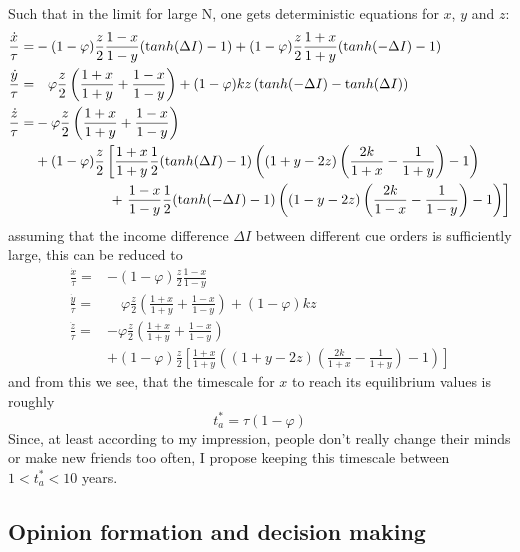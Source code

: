 Such that in the limit for large N, one gets deterministic equations for $x$, $y$ and $z$:
\begin{align}
	\frac{\dot{x}}{\tau} =& -(1-\varphi)\frac{z}{2}\frac{1-x}{1-y}({\mathrm tanh}(\Delta I)-1) + (1-\varphi)\frac{z}{2}\frac{1+x}{1+y}({\mathrm tanh}(-\Delta I)-1) \\
\frac{\dot{y}}{\tau} =& \quad \varphi\frac{z}{2}\left( \frac{1+x}{1+y} + \frac{1-x}{1-y} \right) + (1-\varphi)kz\left( {\mathrm tanh}(-\Delta I) - {\mathrm tanh}(\Delta I) \right) \\
	\frac{\dot{z}}{\tau} =& -\varphi\frac{z}{2}\left( \frac{1+x}{1+y} + \frac{1-x}{1-y} \right) \nonumber \\
	& + (1-\varphi)\frac{z}{2} \left[ \frac{1+x}{1+y} \frac{1}{2}({\mathrm tanh}(\Delta I)-1) \left( (1+y-2z)\left( \frac{2k}{1+x}-\frac{1}{1+y} \right)-1 \right) \right. \nonumber \\
	& \hspace{1.9 cm} + \left.\frac{1-x}{1-y}\frac{1}{2}({\mathrm tanh}(-\Delta I)-1)\left( (1-y-2z)\left( \frac{2k}{1-x}-\frac{1}{1-y} \right)-1 \right)  \right]
	\label{avm_ode}
\end{align}
assuming that the income difference $\Delta I$ between different cue orders is sufficiently large, this can be reduced to
\begin{align}
	\frac{\dot{x}}{\tau} =& -(1-\varphi)\frac{z}{2}\frac{1-x}{1-y} \\
\frac{\dot{y}}{\tau} =& \quad \varphi\frac{z}{2}\left( \frac{1+x}{1+y} + \frac{1-x}{1-y} \right) + (1-\varphi)kz \\
	\frac{\dot{z}}{\tau} =& -\varphi\frac{z}{2}\left( \frac{1+x}{1+y} + \frac{1-x}{1-y} \right) \nonumber \\
	& + (1-\varphi)\frac{z}{2} \left[ \frac{1+x}{1+y} \left( (1+y-2z)\left( \frac{2k}{1+x}-\frac{1}{1+y} \right)-1 \right) \right]
	\label{avm_ode_reduced}
\end{align}
and from this we see, that the timescale for $x$ to reach its equilibrium values is roughly 
\begin{equation}
	t_a^* = \tau(1-\varphi)
	\label{avm_timescale}
\end{equation}
Since, at least according to my impression, people don't really change their minds or make new friends too often, I propose keeping this timescale between $1<t_a^*<10$ years.
\fi
\newpage
\subsection{Opinion formation and decision making}
\label{sec:oppinion_formation_and_decision_making}

